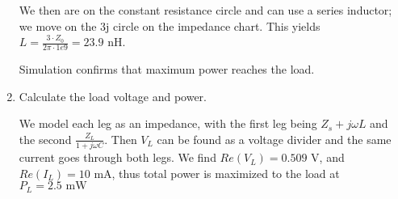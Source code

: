 \begin{enumerate}[label=(\alph*)]
    We then are on the constant resistance circle and can use a series inductor; we move on the 3j circle on the impedance chart.
    This yields $L = \frac{3 \cdot Z_0}{2 \pi \cdot 1e9} = 23.9$ nH.

    Simulation confirms that maximum power reaches the load.

    \item Calculate the load voltage and power.

        We model each leg as an impedance, with the first leg being $Z_s + j \omega L$ and the second $\frac{Z_L}{1 + j\omega C}$. Then $V_L$ can be found as a voltage divider and the same current goes through both legs. We find $Re(V_L) = 0.509 \text{ V}$, and $Re(I_L) = 10 \text{ mA}$, thus total power is maximized to the load at $P_L = 2.5 \text{ mW}$
\end{enumerate}

